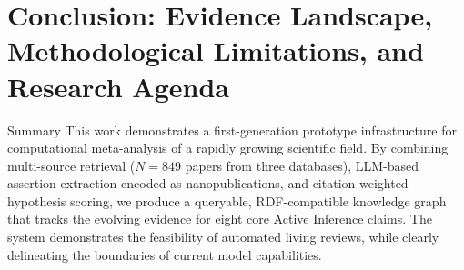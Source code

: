 \documentclass[
  ignorenonframetext,
]{beamer}
\author{\texorpdfstring{}{}}
\date{}
\begin{document}
\section{\texorpdfstring{Conclusion: Evidence Landscape, Methodological
Limitations, and Research Agenda
\label{sec:conclusion}}{Conclusion: Evidence Landscape, Methodological Limitations, and Research Agenda }}\label{conclusion-evidence-landscape-methodological-limitations-and-research-agenda}

\begin{frame}{Summary}
\protect{}\label{summary}
This work demonstrates a first-generation prototype infrastructure for
computational meta-analysis of a rapidly growing scientific field. By
combining multi-source retrieval (\(N = 849\) papers from three
databases), LLM-based assertion extraction encoded as nanopublications,
and citation-weighted hypothesis scoring, we produce a queryable,
RDF-compatible knowledge graph that tracks the evolving evidence for
eight core Active Inference claims. The system demonstrates the
feasibility of automated living reviews, while clearly delineating the
boundaries of current model capabilities.
\end{frame}
\end{document}
